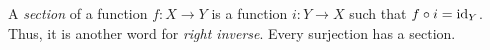  A \textit{section} of a function $f \colon X \to Y$ is a function $i \colon Y \to X$ such that $f \circ i = \operatorname{id}_Y$. Thus, it is another word for \textit{right inverse}.
 Every surjection has a section.